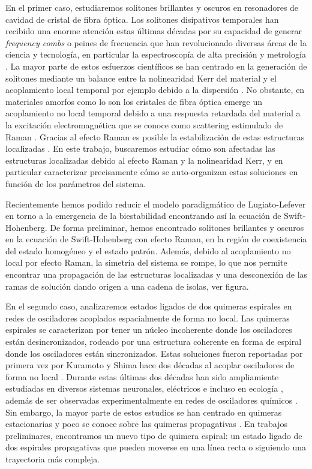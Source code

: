 En el primer caso, estudiaremos solitones brillantes y oscuros en resonadores de cavidad de cristal de fibra óptica. Los solitones disipativos temporales han recibido una enorme atención estas últimas décadas por su capacidad de generar {\em frequency combs} o peines de frecuencia que han revolucionado diversas áreas de la ciencia y tecnología, en particular la espectroscopía de alta precisión y metrología \cite{Raman:FB,Raman:PH}. La mayor parte de estos esfuerzos científicos se han centrado en la generación de solitones mediante un balance entre la nolinearidad Kerr del material y el acoplamiento local temporal por ejemplo debido a la dispersión \cite{Raman:AkhAnk}. No obstante, en materiales amorfos como lo son los cristales de fibra óptica emerge un acoplamiento no local temporal debido a una respuesta retardada del material a la excitación electromagnética que se conoce como scattering estimulado de Raman \cite{Raman:SKV, Raman:LCC}.  Gracias al efecto Raman es posible la estabilización de estas estructuras localizadas \cite{Raman:Stabilize}. En este trabajo, buscaremos estudiar cómo son afectadas las estructuras localizadas debido al efecto Raman y la nolinearidad Kerr, y en particular caracterizar precisamente cómo se auto-organizan estas soluciones en función de los parámetros del sistema.

Recientemente hemos podido reducir el modelo paradigmático de Lugiato-Lefever en torno a la emergencia de la biestabilidad encontrando así la ecuación de Swift-Hohenberg. De forma preliminar, hemos encontrado solitones brillantes y oscuros en la ecuación de Swift-Hohenberg con efecto Raman, en la región de coexistencia del estado homogéneo y el estado patrón. Además, debido al acoplamiento no local por efecto Raman, la simetría del sistema se rompe, lo que nos permite encontrar una propagación de las estructuras localizadas y una desconexión de las ramas de solución dando origen a una cadena de isolas, ver figura.


En el segundo caso, analizaremos estados ligados de dos quimeras espirales en redes de osciladores acoplados espacialmente de forma no local. Las quimeras espirales se caracterizan por tener un núcleo incoherente donde los osciladores están desincronizados, rodeado por una estructura coherente en forma de espiral donde los osciladores están sincronizados. Estas soluciones fueron reportadas por primera vez por Kuramoto y Shima hace dos décadas al acoplar osciladores de forma no local \cite{SpiralChimera:Kuramoto}. Durante estas últimas dos décadas han sido ampliamiente estudiadas en diversos sistemas neuronales, eléctricos e incluso en ecología \cite{SC:FHN2018, SC:Eco2018, SC:BA2020}, además de ser observadas experimentalmente en redes de osciladores químicos \cite{SC:Totz2017, SC:Totz2020}. Sin embargo, la mayor parte de estos estudios se han centrado en quimeras estacionarias y poco se conoce sobre las quimeras propagativas \cite{SC:Omelchenko2020, SC:Bataille}. 
 En trabajos preliminares, encontramos un nuevo tipo de quimera espiral: un estado ligado de dos espirales propagativas que pueden moverse en una línea recta o siguiendo una trayectoria más compleja.

